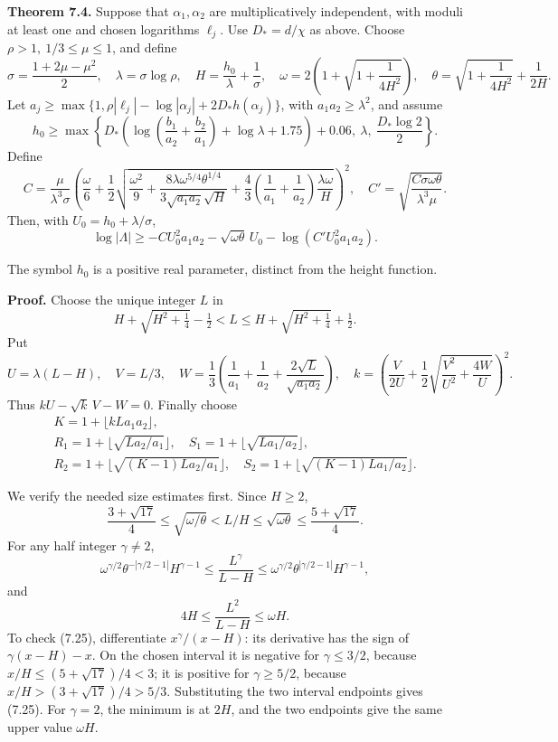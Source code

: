 \documentclass[
  11pt,
  a4paper,
]{article}
\begin{document}
\textbf{Theorem 7.4.} Suppose that \(\alpha_1,\alpha_2\) are
multiplicatively independent, with moduli at least one and chosen
logarithms \(\ell_j\). Use \(D_*=d/\chi\) as above. Choose
\(\rho>1,\ 1/3\le\mu\le1\), and define \[
\sigma=\frac{1+2\mu-\mu^2}{2},\quad
\lambda=\sigma\log\rho,\quad
H=\frac{h_0}{\lambda}+\frac1\sigma,\quad
\omega=2\left(1+\sqrt{1+\frac1{4H^2}}\right),\quad
\theta=\sqrt{1+\frac1{4H^2}}+\frac1{2H}.
\] Let \(a_j\ge\max\{1,\rho|\ell_j|-\log|\alpha_j|+2D_*h(\alpha_j)\}\),
with \(a_1a_2\ge\lambda^2\), and assume \[
h_0\ge\max\left\{
D_*\left(\log\left(\frac{b_1}{a_2}+\frac{b_2}{a_1}\right)+\log\lambda+1.75\right)+0.06,\
\lambda,\ \frac{D_*\log2}{2}\right\}.
\] Define \[
C=\frac{\mu}{\lambda^3\sigma}
\left(\frac{\omega}{6}+\frac12
\sqrt{\frac{\omega^2}{9}
+\frac{8\lambda\omega^{5/4}\theta^{1/4}}{3\sqrt{a_1a_2}\sqrt H}
+\frac43\left(\frac1{a_1}+\frac1{a_2}\right)\frac{\lambda\omega}{H}}
\right)^2,
\quad
C'=\sqrt{\frac{C\sigma\omega\theta}{\lambda^3\mu}}.
\] Then, with \(U_0=h_0+\lambda/\sigma\), \[
\log|\Lambda|
\ge-CU_0^2a_1a_2-\sqrt{\omega\theta}\,U_0
-\log(C'U_0^2a_1a_2). \tag{7.23}
\]

The symbol \(h_0\) is a positive real parameter, distinct from the
height function.

\textbf{Proof.} Choose the unique integer \(L\) in \[
H+\sqrt{H^2+\tfrac14}-\tfrac12<L
\le H+\sqrt{H^2+\tfrac14}+\tfrac12.
\] Put \[
U=\lambda(L-H),\quad V=L/3,\quad
W=\frac13\left(\frac1{a_1}+\frac1{a_2}+\frac{2\sqrt L}{\sqrt{a_1a_2}}\right),
\quad
k=\left(\frac{V}{2U}+\frac12\sqrt{\frac{V^2}{U^2}+\frac{4W}{U}}\right)^2.
\] Thus \(kU-\sqrt k\,V-W=0\). Finally choose \[
\begin{gathered}
K=1+\lfloor kLa_1a_2\rfloor,\\
R_1=1+\lfloor\sqrt{La_2/a_1}\rfloor,\quad
S_1=1+\lfloor\sqrt{La_1/a_2}\rfloor,\\
R_2=1+\lfloor\sqrt{(K-1)La_2/a_1}\rfloor,\quad
S_2=1+\lfloor\sqrt{(K-1)La_1/a_2}\rfloor.
\end{gathered} \tag{7.24}
\]

We verify the needed size estimates first. Since \(H\ge2\), \[
\frac{3+\sqrt{17}}4\le\sqrt{\omega/\theta}<L/H
\le\sqrt{\omega\theta}\le\frac{5+\sqrt{17}}4.
\] For any half integer \(\gamma\ne2\), \[
\omega^{\gamma/2}\theta^{-|\gamma/2-1|}H^{\gamma-1}
\le\frac{L^\gamma}{L-H}
\le\omega^{\gamma/2}\theta^{|\gamma/2-1|}H^{\gamma-1}, \tag{7.25}
\] and \[
4H\le\frac{L^2}{L-H}\le\omega H.
\] To check (7.25), differentiate \(x^\gamma/(x-H)\): its derivative has
the sign of \(\gamma(x-H)-x\). On the chosen interval it is negative for
\(\gamma\le3/2\), because \(x/H\le(5+\sqrt{17})/4<3\); it is positive
for \(\gamma\ge5/2\), because \(x/H>(3+\sqrt{17})/4>5/3\). Substituting
the two interval endpoints gives (7.25). For \(\gamma=2\), the minimum
is at \(2H\), and the two endpoints give the same upper value
\(\omega H\).
\end{document}

